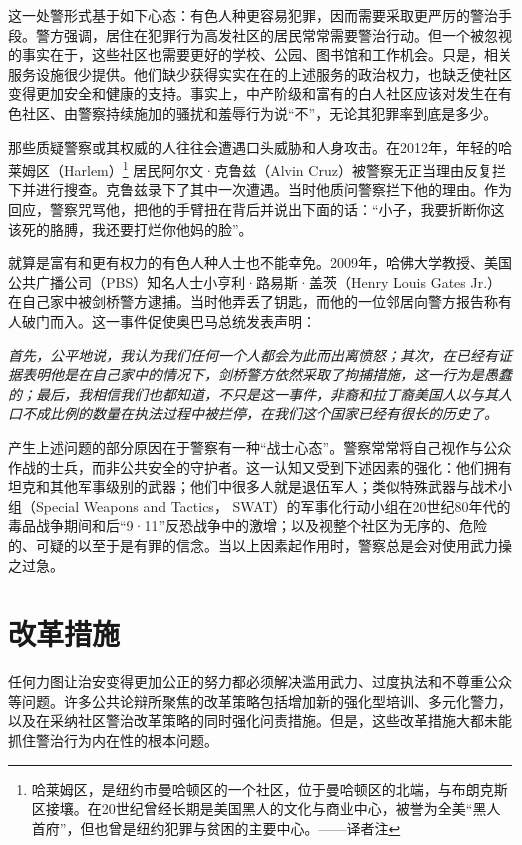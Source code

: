 \documentclass[fontset=fandol, a4paper, 12pt, openright]{ctexbook}
\renewenvironment{quote}
  {\list{}{\rightmargin\leftmargin}%
   \item\relax\small\itshape\color{black}}
  {\endlist}
\begin{document}
这一处警形式基于如下心态：有色人种更容易犯罪，因而需要采取更严厉的警治手段。警方强调，居住在犯罪行为高发社区的居民常常需要警治行动。但一个被忽视的事实在于，这些社区也需要更好的学校、公园、图书馆和工作机会。只是，相关服务设施很少提供。他们缺少获得实实在在的上述服务的政治权力，也缺乏使社区变得更加安全和健康的支持。事实上，中产阶级和富有的白人社区应该对发生在有色社区、由警察持续施加的骚扰和羞辱行为说“不”，无论其犯罪率到底是多少。

那些质疑警察或其权威的人往往会遭遇口头威胁和人身攻击。在2012年，年轻的哈莱姆区（Harlem）\footnote{哈莱姆区，是纽约市曼哈顿区的一个社区，位于曼哈顿区的北端，与布朗克斯区接壤。在20世纪曾经长期是美国黑人的文化与商业中心，被誉为全美“黑人首府”，但也曾是纽约犯罪与贫困的主要中心。——译者注} 居民阿尔文·克鲁兹（Alvin Cruz）被警察无正当理由反复拦下并进行搜查。克鲁兹录下了其中一次遭遇。当时他质问警察拦下他的理由。作为回应，警察咒骂他，把他的手臂扭在背后并说出下面的话：“小子，我要折断你这该死的胳膊，我还要打烂你他妈的脸”。

就算是富有和更有权力的有色人种人士也不能幸免。2009年，哈佛大学教授、美国公共广播公司（PBS）知名人士小亨利·路易斯·盖茨（Henry Louis Gates Jr.）在自己家中被剑桥警方逮捕。当时他弄丢了钥匙，而他的一位邻居向警方报告称有人破门而入。这一事件促使奥巴马总统发表声明：

\begin{quote}
首先，公平地说，我认为我们任何一个人都会为此而出离愤怒；其次，在已经有证据表明他是在自己家中的情况下，剑桥警方依然采取了拘捕措施，这一行为是愚蠢的；最后，我相信我们也都知道，不只是这一事件，非裔和拉丁裔美国人以与其人口不成比例的数量在执法过程中被拦停，在我们这个国家已经有很长的历史了。
\end{quote}

产生上述问题的部分原因在于警察有一种“战士心态”。警察常常将自己视作与公众作战的士兵，而非公共安全的守护者。这一认知又受到下述因素的强化：他们拥有坦克和其他军事级别的武器；他们中很多人就是退伍军人；类似特殊武器与战术小组（Special Weapons and Tactics， SWAT）的军事化行动小组在20世纪80年代的毒品战争期间和后“9·11”反恐战争中的激增；以及视整个社区为无序的、危险的、可疑的以至于是有罪的信念。当以上因素起作用时，警察总是会对使用武力操之过急。

\section{改革措施}

任何力图让治安变得更加公正的努力都必须解决滥用武力、过度执法和不尊重公众等问题。许多公共论辩所聚焦的改革策略包括增加新的强化型培训、多元化警力，以及在采纳社区警治改革策略的同时强化问责措施。但是，这些改革措施大都未能抓住警治行为内在性的根本问题。
\end{document}
